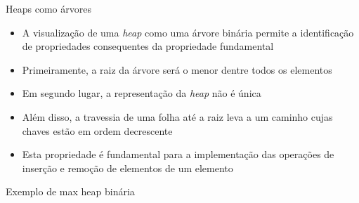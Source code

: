 \begin{frame}[fragile]{Heaps como árvores}

    \begin{itemize}
        \item A visualização de uma \textit{heap} como uma árvore binária permite a 
            identificação de propriedades consequentes da propriedade fundamental

        \item Primeiramente, a raiz da árvore será o menor dentre todos os elementos

        \item Em segundo lugar, a representação da \textit{heap} não é única

        \item Além disso, a travessia de uma folha até a raiz leva a um caminho cujas chaves
            estão em ordem decrescente

        \item Esta propriedade é fundamental para a implementação das operações de inserção e
            remoção de elementos de um elemento
    \end{itemize}

\end{frame}

\begin{frame}[fragile]{Exemplo de max heap binária}

    \begin{figure}
        \centering
    \end{figure}

\end{frame}

